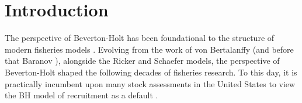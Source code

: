 %
\section{Introduction\label{schnuteInt}}

%
The perspective of Beverton-Holt \cite{beverton_dynamics_1957} has been 
foundational to the structure of modern fisheries models \cite{holden_beverton_1995}. 
Evolving from the work of von Bertalanffy \cite{von_bertalanffy_quantitative_1938} (and before that Baranov \cite{baranov_question_1918, sharov_unknown_2021}), 
alongside the Ricker \cite{ricker_stock_1954} and Schaefer \cite{schaefer_study_1957}   
models, the perspective of Beverton-Holt shaped the following decades of fisheries 
research. To this day, it is practically incumbent upon many stock assessments in the United States 
to view the BH model of recruitment as a default \cite{methot_stock_2013, dick_stock_2023}. %



